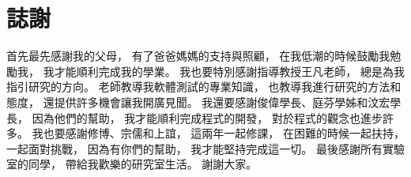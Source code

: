 
\chapter{誌謝}

\setlength{\parindent}{2em}
首先最先感謝我的父母，
有了爸爸媽媽的支持與照顧，
在我低潮的時候鼓勵我勉勵我，
我才能順利完成我的學業。
我也要特別感謝指導教授王凡老師，
總是為我指引研究的方向。
老師教導我軟體測試的專業知識，
也教導我進行研究的方法和態度，
還提供許多機會讓我開廣見聞。
我還要感謝俊偉學長、庭芬學姊和汶宏學長，
因為他們的幫助，
我才能順利完成程式的開發，
對於程式的觀念也進步許多。
我也要感謝修博、宗儒和上誼，
這兩年一起修課，
在困難的時候一起扶持，
一起面對挑戰，
因為有你們的幫助，
我才能堅持完成這一切。
最後感謝所有實驗室的同學，
帶給我歡樂的研究室生活。
謝謝大家。







